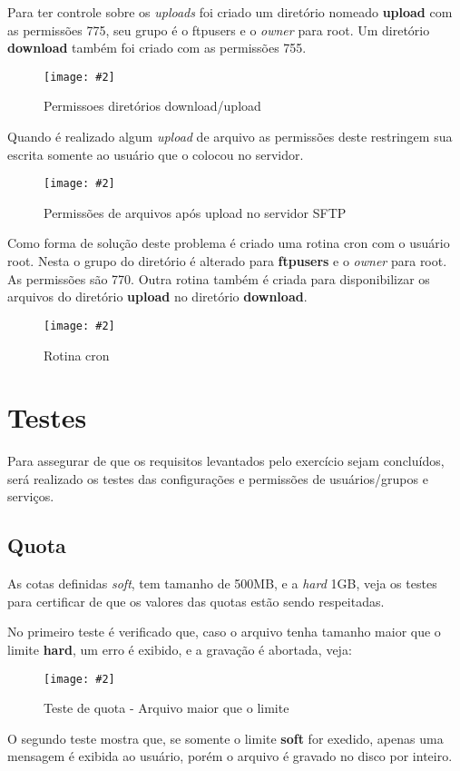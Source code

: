 \documentclass[
	12pt,				%
	openright,			%
	twoside,			%
	openany,			%
	a4paper,			%
	chapter=TITLE,		%
	section=TITLE,		%
	subsection=TITLE,	%
	subsubsection=TITLE,%
	english,
	brazil				%
]{abntex2}
\newcommand{\includeImage}[3] {

\begin{figure}[H]
 	 \centering
  		\texttt{[image: \#2]}
  	\caption{#3}
\end{figure}

}
\begin{document}
Para ter controle sobre os \textit{uploads} foi criado um diretório nomeado \textbf{upload} com as permissões 775, seu grupo é o ftpusers e o \textit{owner} para root. Um diretório \textbf{download} também foi criado com as permissões 755.

\includeImage{0.5}{../imgs/5_sftp/permissoes_download_upload.png}{Permissoes diretórios download/upload}

Quando é realizado algum \textit{upload} de arquivo as permissões deste restringem sua escrita somente ao usuário que o colocou no servidor.

\includeImage{0.5}{../imgs/5_sftp/permissoes_upload_arquivo.png}{Permissões de arquivos após upload no servidor SFTP}

Como forma de solução deste problema é criado uma rotina cron com o usuário root. Nesta o grupo do diretório é alterado para \textbf{ftpusers} e o \textit{owner} para root. As permissões são 770. 
Outra rotina também é criada para disponibilizar os arquivos do diretório \textbf{upload} no diretório \textbf{download}.

\includeImage{0.5}{../imgs/5_sftp/rotina_crontab.png}{Rotina cron}

\chapter{Testes}

Para assegurar de que os requisitos levantados pelo exercício sejam concluídos, será realizado os testes das configurações e permissões de usuários/grupos e serviços.

\section{Quota}

As cotas definidas \textit{soft}, tem tamanho de 500MB, e a \textit{hard} 1GB, veja os testes para certificar de que os valores das quotas estão sendo respeitadas.

No primeiro teste é verificado que, caso o arquivo tenha tamanho maior que o limite \textbf{hard}, um erro é exibido, e a gravação é abortada, veja:

\includeImage{0.5}{../imgs/3_quota/1_test.png}{Teste de quota - Arquivo maior que o limite} 

O segundo teste mostra que, se somente o limite \textbf{soft} for exedido, apenas uma mensagem é exibida ao usuário, porém  o arquivo é gravado no disco por inteiro.
\end{document}
